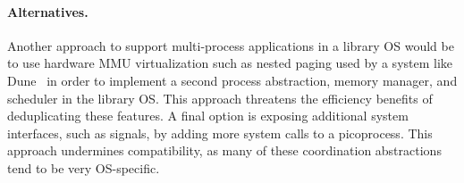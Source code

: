 \paragraph{Alternatives.}
Another approach to support multi-process applications in a library OS would be to use hardware MMU virtualization such as nested paging used by a system like Dune~\cite{belay12dune}
in order to implement a second process abstraction, memory manager, and scheduler in the library OS.
This approach threatens the efficiency benefits of deduplicating these features.
A final option is exposing additional system interfaces, such as signals, by adding more system calls to a picoprocess. This approach undermines compatibility, as many of these coordination abstractions tend to be very OS-specific.





